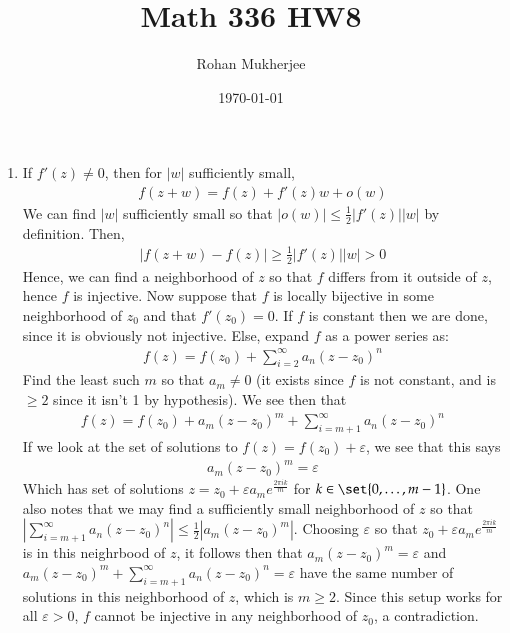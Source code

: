 \documentclass[12pt]{article}
\title{Math 336 HW8}
\date{\today}
\author{Rohan Mukherjee}
\theoremstyle{definitionstyle}
\def \ve{\varepsilon}
\begin{document}
	\maketitle
	\begin{enumerate}[leftmargin=\labelsep]
		\item If $f'(z) \neq 0$, then for $|w|$ sufficiently small,
		\begin{align*}
			f(z+w) = f(z) + f'(z)w + o(w)
		\end{align*}
		We can find $|w|$ sufficiently small so that $|o(w)| \leq \frac12|f'(z)||w|$ by definition. Then,
		\begin{align*}
			|f(z+w) - f(z)| \geq \frac12|f'(z)||w| > 0
		\end{align*}
		Hence, we can find a neighborhood of $z$ so that $f$ differs from it outside of $z$, hence $f$ is injective. Now suppose that $f$ is locally bijective in some neighborhood of $z_0$ and that $f'(z_0) = 0$. If $f$ is constant then we are done, since it is obviously not injective. Else, expand $f$ as a power series as:
		\begin{align*}
			f(z) = f(z_0) + \sum_{i=2}^\infty a_n(z-z_0)^n
		\end{align*}
		Find the least such $m$ so that $a_m \neq 0$ (it exists since $f$ is not constant, and is $\geq 2$ since it isn't 1 by hypothesis). We see then that
		\begin{align*}
			f(z) = f(z_0) + a_m(z-z_0)^m + \sum_{i=m+1}^\infty a_n(z-z_0)^n
		\end{align*}
		If we look at the set of solutions to $f(z) = f(z_0) + \ve$, we see that this says
		\begin{align*}
			a_m(z-z_0)^m = \ve
		\end{align*}
		Which has set of solutions $z = z_0 + \ve a_me^{\frac{2\pi i k}m}$ for $k \in \set{0, \ldots, m-1}$. One also notes that we may find a sufficiently small neighborhood of $z$ so that $|\sum_{i=m+1}^\infty a_n(z-z_0)^n| \leq \frac12|a_m(z-z_0)^m|$. Choosing $\ve$ so that $z_0 + \ve a_me^{\frac{2\pi i k}m}$ is in this neighrbood of $z$, it follows then that $a_m(z-z_0)^m = \ve$ and $a_m(z-z_0)^m + \sum_{i=m+1}^\infty a_n(z-z_0)^n = \ve$ have the same number of solutions in this neighborhood of $z$, which is $m \geq 2$. Since this setup works for all $\ve > 0$, $f$ cannot be injective in any neighborhood of $z_0$, a contradiction.
		

\end{enumerate}
\end{document}

